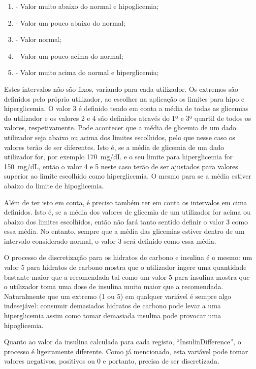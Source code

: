 \begin{enumerate}
\item  - Valor muito abaixo do normal e hipoglicemia;
\item  - Valor um pouco abaixo do normal;
\item  - Valor normal;
\item  - Valor um pouco acima do normal;
\item  - Valor muito acima do normal e hiperglicemia;
\end{enumerate}
Estes intervalos não são fixos, variando para cada utilizador. Os extremos são definidos pelo próprio utilizador, ao escolher na aplicação os limites para hipo e hiperglicemia. O valor 3 é definido tendo em conta a média de todas as glicemias do utilizador e os valores 2 e 4 são definidos através do 1º e 3º quartil de todos os valores, respetivamente. Pode acontecer que a média de glicemia de um dado utilizador seja abaixo ou acima dos limites escolhidos, pelo que nesse caso os valores terão de ser diferentes. Isto é, se a média de glicemia de um dado utilizador for, por exemplo 170~mg/dL e o seu limite para hiperglicemia for 150~mg/dL, então o valor 4 e 5 neste caso terão de ser ajustados para valores superior ao limite escolhido como hiperglicemia. O mesmo para se a média estiver abaixo do limite de hipoglicemia.

Além de ter isto em conta, é preciso também ter em conta os intervalos em cima definidos. Isto é, se a média dos valores de glicemia de um utilizador for acima ou abaixo dos limites escolhidos, então não fará tanto sentido definir o valor 3 como essa média. No entanto, sempre que a média das glicemias estiver dentro de um intervalo considerado normal, o valor 3 será definido como essa média.

O processo de discretização para os hidratos de carbono e insulina é o mesmo: um valor 5 para hidratos de carbono mostra que o utilizador ingere uma quantidade bastante maior que a recomendada tal como um valor 5 para insulina mostra que o utilizador toma uma dose de insulina muito maior que a recomendada. Naturalmente que um extremo (1 ou 5) em qualquer variável é sempre algo indesejável: consumir demasiados hidratos de carbono pode levar a uma hiperglicemia assim como tomar demasiada insulina pode provocar uma hipoglicemia.

Quanto ao valor da insulina calculada para cada registo, ``Insulin\textunderscore Difference'', o processo é ligeiramente diferente. Como já mencionado, esta variável pode tomar valores negativos, positivos ou 0 e portanto, precisa de ser discretizada.


